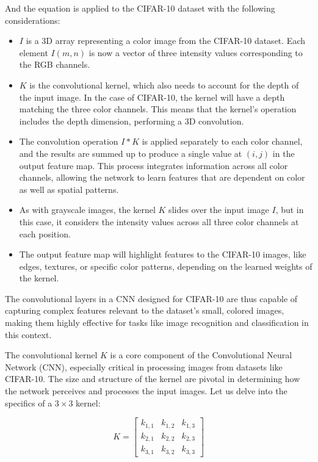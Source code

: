 \documentclass[conference]{IEEEtran}
\begin{document}
	And the equation is applied to the CIFAR-10 dataset with the following considerations:
	\begin{itemize}
		\item \(I\) is a 3D array representing a color image from the CIFAR-10 dataset. Each element \(I(m,n)\) is now a vector of three intensity values corresponding to the RGB channels.
		
		\item \(K\) is the convolutional kernel, which also needs to account for the depth of the input image. In the case of CIFAR-10, the kernel will have a depth matching the three color channels. This means that the kernel's operation includes the depth dimension, performing a 3D convolution.
		
		\item The convolution operation \(I * K\) is applied separately to each color channel, and the results are summed up to produce a single value at \((i,j)\) in the output feature map. This process integrates information across all color channels, allowing the network to learn features that are dependent on color as well as spatial patterns.
		
		\item As with grayscale images, the kernel \(K\) slides over the input image \(I\), but in this case, it considers the intensity values across all three color channels at each position. 
		
		\item The output feature map will highlight features to the CIFAR-10 images, like edges, textures, or specific color patterns, depending on the learned weights of the kernel.
	\end{itemize}
	
	The convolutional layers in a CNN designed for CIFAR-10 are thus capable of capturing complex features relevant to the dataset's small, colored images, making them highly effective for tasks like image recognition and classification in this context.
	
	The convolutional kernel \(K\) is a core component of the Convolutional Neural Network (CNN), especially critical in processing images from datasets like CIFAR-10. The size and structure of the kernel are pivotal in determining how the network perceives and processes the input images. Let us delve into the specifics of a \(3 \times 3\) kernel:
	
	\begin{equation}
		K = \begin{bmatrix}
			k_{1,1} & k_{1,2} & k_{1,3} \\
			k_{2,1} & k_{2,2} & k_{2,3} \\
			k_{3,1} & k_{3,2} & k_{3,3}
		\end{bmatrix}
	\end{equation}
	
\end{document}
